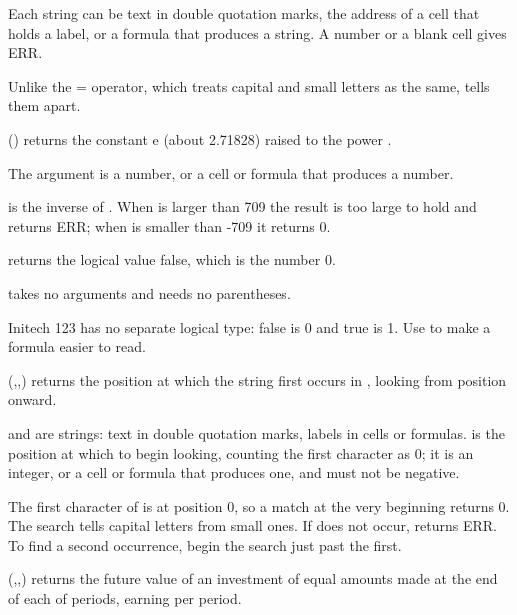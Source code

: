 Each string can be text in double quotation marks, the address of a cell that holds a label, or a formula that produces a string. A number or a blank cell gives ERR.

Unlike the = operator, which treats capital and small letters as the same,  tells them apart.

\Examples
{}

() returns the constant e (about 2.71828) raised to the power .

The argument  is a number, or a cell or formula that produces a number.

 is the inverse of . When  is larger than 709 the result is too large to hold and  returns ERR; when  is smaller than -709 it returns 0.

\Examples
{}

 returns the logical value false, which is the number 0.

 takes no arguments and needs no parentheses.

Initech 123 has no separate logical type: false is 0 and true is 1. Use  to make a formula easier to read.

\Examples
{}

(,,) returns the position at which the string  first occurs in , looking from position  onward.

 and  are strings: text in double quotation marks, labels in cells or formulas.  is the position at which to begin looking, counting the first character as 0; it is an integer, or a cell or formula that produces one, and must not be negative.

The first character of  is at position 0, so a match at the very beginning returns 0. The search tells capital letters from small ones. If  does not occur,  returns ERR. To find a second occurrence, begin the search just past the first.

\Examples
{}

(,,) returns the future value of an investment of equal  amounts made at the end of each of  periods, earning  per period.

